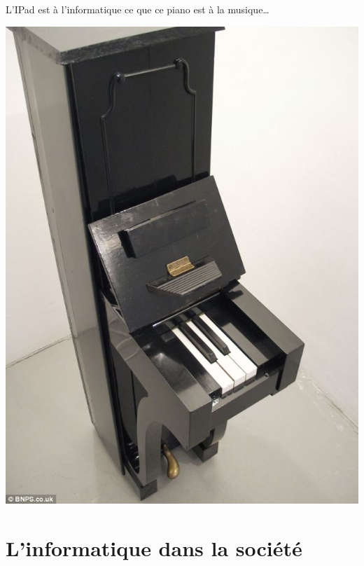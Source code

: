 \documentclass[french]{beamer}
\begin{document}
\begin{frame}
L'IPad est à l'informatique ce que ce piano est à la musique\ldots{}
 \begin{center}
\includegraphics[height=.8\textheight]{./IpadPiano2touches.jpg}
\end{center}
\end{frame}



\section{L'informatique dans la société}
\end{document}
